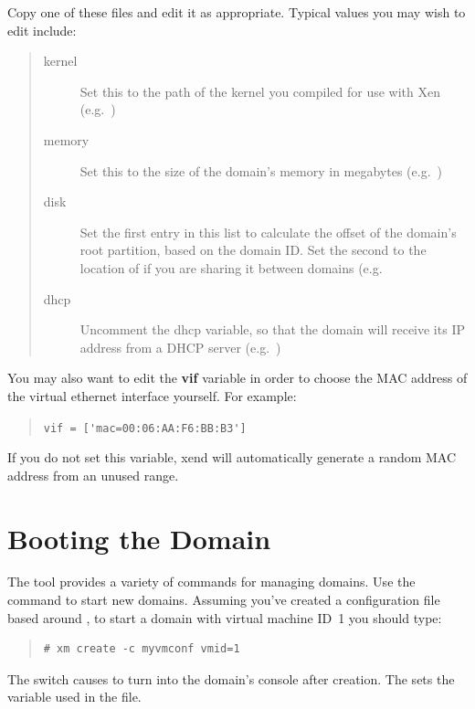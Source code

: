 \documentclass[11pt,twoside,final,openright]{report}
\def\xend{{xend}\xspace}
\begin{document}
Copy one of these files and edit it as appropriate.
Typical values you may wish to edit include: 

\begin{quote}
\begin{description}
\item[kernel] Set this to the path of the kernel you compiled for use
              with Xen (e.g.\  )
\item[memory] Set this to the size of the domain's memory in
megabytes (e.g.\ )
\item[disk] Set the first entry in this list to calculate the offset
of the domain's root partition, based on the domain ID.  Set the
second to the location of  if you are sharing it between
domains (e.g.\ 
\item[dhcp] Uncomment the dhcp variable, so that the domain will
receive its IP address from a DHCP server (e.g.\ )
\end{description}
\end{quote}

You may also want to edit the {\bf vif} variable in order to choose
the MAC address of the virtual ethernet interface yourself.  For
example: 
\begin{quote}
\verb_vif = ['mac=00:06:AA:F6:BB:B3']_
\end{quote}
If you do not set this variable, \xend will automatically generate a
random MAC address from an unused range.


\section{Booting the Domain}

The  tool provides a variety of commands for managing domains.
Use the  command to start new domains. Assuming you've 
created a configuration file  based around
, to start a domain with virtual 
machine ID~1 you should type: 

\begin{quote}
\begin{verbatim}
# xm create -c myvmconf vmid=1
\end{verbatim}
\end{quote}


The  switch causes  to turn into the domain's
console after creation.  The  sets the 
variable used in the  file. 
\end{document}
